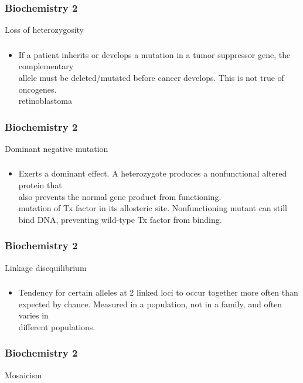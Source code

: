 \documentclass[11pt]{beamer}
\begin{document}
\begin{frame}
 \frametitle{Biochemistry 2}
Loss of heterozygosity
\end{frame}

\begin{frame}
 \frametitle{}
\begin{itemize}
\item If a patient inherits or develops a mutation in a tumor suppressor gene, the complementary \\ allele must be deleted/mutated before cancer develops. This is not true of oncogenes. \\ retinoblastoma 
\end{itemize}
\end{frame}

\begin{frame}
 \frametitle{Biochemistry 2}
Dominant negative mutation
\end{frame}

\begin{frame}
 \frametitle{}
\begin{itemize}
\item Exerts a dominant effect. A heterozygote produces a nonfunctional altered protein that \\ also prevents the normal gene product from functioning. \\ mutation of Tx factor in its allosteric site. Nonfunctioning mutant can still bind DNA, preventing wild-type Tx factor from binding. 
\end{itemize}
\end{frame}

\begin{frame}
 \frametitle{Biochemistry 2}
Linkage disequilibrium
\end{frame}

\begin{frame}
 \frametitle{}
\begin{itemize}
\item Tendency for certain alleles at 2 linked loci to occur together more often than \\ expected by chance. Measured in a population, not in a family, and often varies in \\ different populations.
\end{itemize}
\end{frame}

\begin{frame}
 \frametitle{Biochemistry 2}
Mosaicism
\end{frame}
\end{document}
